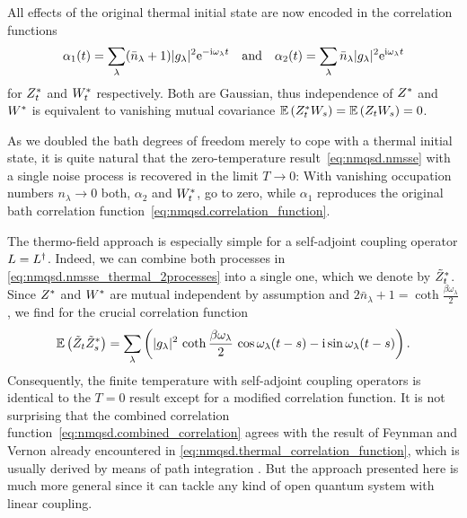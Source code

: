 All effects of the original thermal initial state are now encoded in the correlation functions
\begin{equation}
  \alpha_1(t) = \sum_\lambda (\bar n_\lambda + 1) \abs{g_\lambda}^2 \exp[-\ii\omega_\lambda t] \quad \mbox{and} \quad
  \alpha_2(t) = \sum_\lambda \bar n_\lambda \abs{g_\lambda}^2 \exp[\ii\omega_\lambda t]
  \label{eq:nmqsd.cov_2processes}
\end{equation}
for ${Z}^*_t$ and ${W}^*_t$ respectively.
Both are Gaussian, thus independence of ${Z}^*$ and ${W}^*$ is equivalent to vanishing mutual covariance $\E[\ZZ_t W_s] = \E[Z_t W_s] = 0$.

As we doubled the bath degrees of freedom merely to cope with a thermal initial state, it is quite natural that the zero-temperature result~\ref{eq:nmqsd.nmsse} with a single noise process is recovered in the limit $T \to 0$:
With vanishing occupation numbers $n_\lambda \to 0$ both, $\alpha_2$ and ${W}^*_t$, go to zero, while $\alpha_1$ reproduces the original bath correlation function~\ref{eq:nmqsd.correlation_function}.

The thermo-field approach is especially simple for a self-adjoint coupling operator $L = L^\dagger$.
Indeed, we can combine both processes in \autoref{eq:nmqsd.nmsse_thermal_2processes} into a single one, which we denote by ${\tilde Z}^*_t$.
Since ${Z}^*$ and ${W}^*$ are mutual independent by assumption and $2\bar n_\lambda + 1 = \coth{\frac{\beta\omega_\lambda}{2}}$, we find for the crucial correlation function
\begin{equation}
  \E[\tilde Z_t \tildeZZ_s] = \sum_\lambda \left(\abs{g_\lambda}^2 \, \coth{\frac{\beta \omega_\lambda}{2}} \, \cos{\omega_\lambda (t-s)} - \ii \sin{\omega_\lambda (t-s)} \right).
  \label{eq:nmqsd.combined_correlation}
\end{equation}
Consequently, the finite temperature \NMSSE with self-adjoint coupling operators is identical to the $T=0$ result except for a modified correlation function.
It is not surprising that the combined correlation function~\ref{eq:nmqsd.combined_correlation} agrees with the result of Feynman and Vernon already encountered in \autoref{eq:nmqsd.thermal_correlation_function}, which is usually derived by means of path integration \cite{FeVe63_quantum_dissipative}.
But the approach presented here is much more general since it can tackle any kind of open quantum system with linear coupling.


